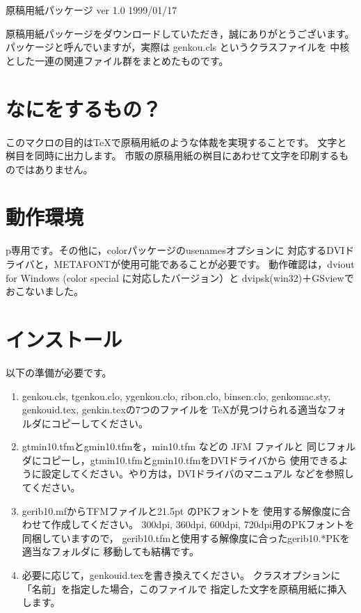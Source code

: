 \documentclass{jarticle}
\begin{document}
\begin{center}
    {\LARGE 原稿用紙パッケージ\vskip5mm
        ver 1.0\vskip5mm
        \large 1999/01/17}\vskip10mm
\end{center}

原稿用紙パッケージをダウンロードしていただき，誠にありがとうございます。
パッケージと呼んでいますが，実際は genkou.cls というクラスファイルを
中核とした一連の関連ファイル群をまとめたものです。

\section{なにをするもの？}
このマクロの目的は\TeX{}で原稿用紙のような体裁を実現することです。
文字と桝目を同時に出力します。
市販の原稿用紙の桝目にあわせて文字を印刷するものではありません。

\section{動作環境}
p\LaTeXe{}専用です。その他に，colorパッケージのusenamesオプションに
対応するDVIドライバと，METAFONTが使用可能であることが必要です。
動作確認は，dviout for Windows (color special に対応したバージョン）と
dvipsk(win32)＋GSviewでおこないました。

\section{インストール}
以下の準備が必要です。

\begin{enumerate}
    \item genkou.cls, tgenkou.clo, ygenkou.clo, ribon.clo, binsen.clo,
          genkomac.sty, genkouid.tex, genkin.texの7つのファイルを
          \TeX{}が見つけられる適当なフォルダにコピーしてください。
    \item gtmin10.tfmとgmin10.tfmを，min10.tfm などの JFM ファイルと
          同じフォルダにコピーし，gtmin10.tfmとgmin10.tfmをDVIドライバから
          使用できるように設定してください。やり方は，DVIドライバのマニュアル
          などを参照してください。
    \item gerib10.mfからTFMファイルと21.5pt のPKフォントを
          使用する解像度に合わせて作成してください。
          300dpi, 360dpi, 600dpi, 720dpi用のPKフォントを同梱していますので，
          gerib10.tfmと使用する解像度に合ったgerib10.*PKを適当なフォルダに
          移動しても結構です。
    \item 必要に応じて，genkouid.texを書き換えてください。
          クラスオプションに「名前」を指定した場合，このファイルで
          指定した文字を原稿用紙に挿入します。
\end{enumerate}
\end{document}
